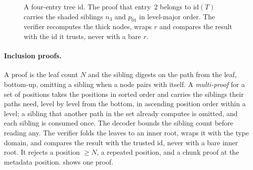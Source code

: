 \documentclass[10pt,letterpaper]{article}
\theoremstyle{remark}
\newcommand{\Hb}{\mathsf{H}}
\newcommand{\D}{\mathsf{D}}
\newcommand{\cc}{\mathbin{\|}}
\newcommand{\str}[1]{\texttt{"\romannumeral-`0#1"}}
\begin{document}
\begin{figure}[!htb]
\centering
{}
\caption{A four-entry tree id. The proof that entry~2 belongs to
$\mathrm{id}(T)$ carries the shaded siblings $n_3$ and $p_{01}$ in level-major
order. The verifier recomputes the thick nodes, wraps $r$ and compares the
result with the id it trusts, never with a bare $r$.}
\label{fig:tree}
\end{figure}

\paragraph{Inclusion proofs.}
A proof is the leaf count $N$ and the sibling digests on the path from the
leaf, bottom-up, omitting a sibling when a node pairs with itself. A
\emph{multi-proof} for a set of positions takes the positions in sorted order
and carries the siblings their paths need, level by level from the bottom, in
ascending position order within a level; a sibling that another path in the
set already computes is omitted, and each sibling is consumed once. The decoder
bounds the sibling count before reading any. The verifier folds the leaves to
an inner root, wraps it with the type domain, and compares the result with the
trusted id, never with a bare inner root. It rejects a position $\ge N$, a
repeated position, and a chunk proof at the metadata position. 
shows one proof.
\end{document}
